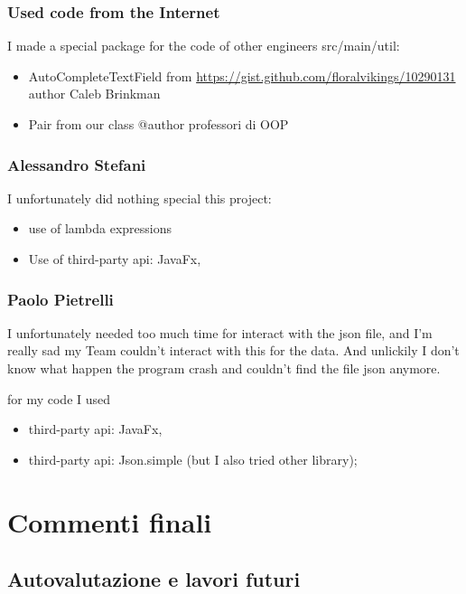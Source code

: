 \documentclass[a4paper,12pt]{report}
\begin{document}
\subsection*{Used code from the Internet}

I made a special package for the code of other engineers src/main/util:
\begin{itemize}
    \item AutoCompleteTextField from \url{https://gist.github.com/floralvikings/10290131} author Caleb Brinkman
    \item Pair from our class @author professori di OOP 
\end{itemize}

\subsection{Alessandro Stefani}
I unfortunately did nothing special this project:
\begin{itemize}
    \item use of lambda expressions
    \item Use of third-party api: JavaFx,
\end{itemize}

\subsection{Paolo Pietrelli}
I unfortunately needed too much time for interact with the json file, and I'm really sad my Team couldn't interact with this for the data.
And unlickily I don't know what happen the program crash and couldn't find the file json anymore.

for my code I used
\begin{itemize}
    \item third-party api: JavaFx,
    \item third-party api: Json.simple (but I also tried other library);
\end{itemize}


\chapter{Commenti finali}

\section{Autovalutazione e lavori futuri}
\end{document}
